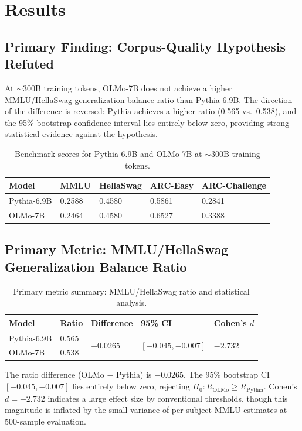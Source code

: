 \section{Results}

\subsection{Primary Finding: Corpus-Quality Hypothesis Refuted}

At $\sim$300B training tokens, OLMo-7B does not achieve a higher MMLU/HellaSwag generalization balance ratio than Pythia-6.9B. The direction of the difference is reversed: Pythia achieves a higher ratio (0.565 vs.\ 0.538), and the 95\% bootstrap confidence interval lies entirely below zero, providing strong statistical evidence against the hypothesis.

\begin{table}[h]
\centering
\caption{Benchmark scores for Pythia-6.9B and OLMo-7B at $\sim$300B training tokens.}
\begin{tabular}{lllll}
\toprule
Model & MMLU & HellaSwag & ARC-Easy & ARC-Challenge \\
\midrule
Pythia-6.9B & 0.2588 & 0.4580 & 0.5861 & 0.2841 \\
OLMo-7B     & 0.2464 & 0.4580 & 0.6527 & 0.3388 \\
\bottomrule
\end{tabular}
\end{table}

\subsection{Primary Metric: MMLU/HellaSwag Generalization Balance Ratio}

\begin{table}[h]
\centering
\caption{Primary metric summary: MMLU/HellaSwag ratio and statistical analysis.}
\begin{tabular}{lllll}
\toprule
Model & Ratio & Difference & 95\% CI & Cohen's $d$ \\
\midrule
Pythia-6.9B & 0.565 & \multirow{2}{*}{$-0.0265$} & \multirow{2}{*}{$[-0.045, -0.007]$} & \multirow{2}{*}{$-2.732$} \\
OLMo-7B     & 0.538 & & & \\
\bottomrule
\end{tabular}
\end{table}

The ratio difference (OLMo $-$ Pythia) is $-0.0265$. The 95\% bootstrap CI $[-0.045, -0.007]$ lies entirely below zero, rejecting $H_0: R_{\text{OLMo}} \geq R_{\text{Pythia}}$. Cohen's $d = -2.732$ indicates a large effect size by conventional thresholds, though this magnitude is inflated by the small variance of per-subject MMLU estimates at 500-sample evaluation.

